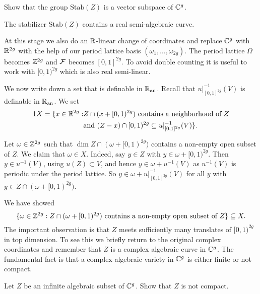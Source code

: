 \begin{exercise}
  Show that the group $\mathrm{Stab}(Z)$ is a vector subspace of
  ${\mathbb{C}}^g$. 
\end{exercise}

\begin{lemma}
  The stabilizer $\mathrm{Stab}(Z)$ contains a real semi-algebraic curve. 
\end{lemma}

At this stage we also do an ${\mathbb{R}}$-linear change of coordinates and
replace ${\mathbb{C}}^g$ with ${\mathbb{R}}^{2g}$ with the help of our period lattice
basis $(\omega_1,\ldots,\omega_{2g})$.
The period lattice $\Omega$ becomes ${\mathbb{Z}}^{2g}$ and ${\mathcal F}$ becomes
$[0,1]^{2g}$. To avoid double counting it is useful to work with
$[0,1)^{2g}$ which is also real semi-linear. 

We now write down a set that is definable in ${{\mathbb{R}}_{\mathrm{an}}}$. Recall that
$u|_{[0,1]^{2g}}^{-1}(V)$ is definable in ${{\mathbb{R}}_{\mathrm{an}}}$. We set
\begin{alignat*}1  
  X =  \{x \in\IR^{2g} : & Z\cap(x+[0,1)^{2g})\text{ contains a neighborhood
    of $Z$}\\
  &\text{and } (Z-x)\cap [0,1)^{2g} \subset u|_{[0,1]^{2g}}^{-1}(V)\}. 
\end{alignat*}

Let $\omega \in{\mathbb{Z}}^{2g}$ such that $\dim Z\cap (\omega+[0,1)^{2g})$
contains a non-empty open subset of $Z$. We claim that $\omega\in X$.
Indeed, say $y\in Z$ with $y\in \omega+[0,1)^{2g}$. Then $y\in
u^{-1}(V)$, using $u(Z)\subset V$, and hence $y \in \omega+u^{-1}(V)$
as $u^{-1}(V)$ is periodic under the period lattice. So $y \in
\omega+u|_{[0,1]^{2g}}^{-1}(V)$ for all $y$ with $y\in Z\cap
(\omega+[0,1)^{2g})$.

We have showed
$$\{\omega\in{\mathbb{Z}}^{2g} :    Z\cap (\omega+[0,1)^{2g})\text{ contains a non-empty open subset of $Z$}\} \subseteq X.$$ The important observation is that
$Z$ meets sufficiently many translates of $[0,1)^{2g}$ in top dimension. To see
this 
we briefly  return to the original complex
coordinates and remember that $Z$ is a complex
algebraic curve in ${\mathbb{C}}^g$. The fundamental fact is that a complex
algebraic variety in ${\mathbb{C}}^g$ is either finite or not compact.

\begin{exercise}
  Let $Z$ be an infinite algebraic subset of ${\mathbb{C}}^g$. Show that $Z$ is
  not compact. 
\end{exercise}

